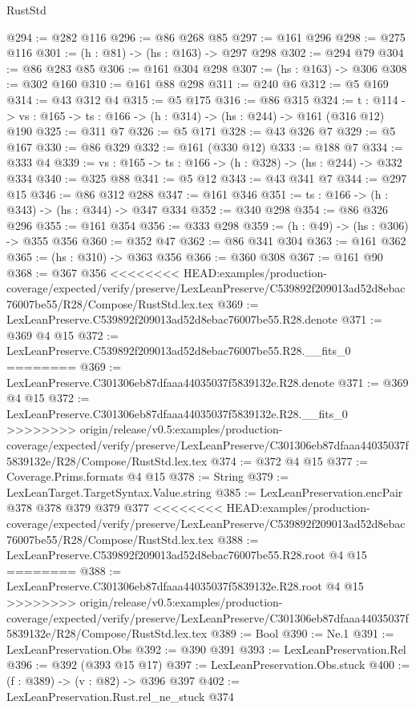 \begin{lexlean}{RustStd}
\begin{coremodule}
{\begin{coremodule}
@294 := @282 @116
@296 := @86 @268 @85
@297 := @161 @296
@298 := @275 @116
@301 := (h : @81) -> (hs : @163) -> @297 @298
@302 := @294 @79
@304 := @86 @283 @85
@306 := @161 @304 @298
@307 := (hs : @163) -> @306
@308 := @302 @160
@310 := @161 @88 @298
@311 := @240 @6
@312 := @5 @169
@314 := @43 @312 @4
@315 := @5 @175
@316 := @86 @315
@324 := {t : @114} ->
  {vs : @165} -> {ts : @166} -> (h : @314) -> (hs : @244) -> @161 (@316 @12) @190
@325 := @311 @7
@326 := @5 @171
@328 := @43 @326 @7
@329 := @5 @167
@330 := @86 @329
@332 := @161 (@330 @12)
@333 := @188 @7
@334 := @333 @4
@339 := {vs : @165} -> {ts : @166} -> (h : @328) -> (hs : @244) -> @332 @334
@340 := @325 @88
@341 := @5 @12
@343 := @43 @341 @7
@344 := @297 @15
@346 := @86 @312 @288
@347 := @161 @346
@351 := {ts : @166} -> (h : @343) -> (hs : @344) -> @347 @334
@352 := @340 @298
@354 := @86 @326 @296
@355 := @161 @354
@356 := @333 @298
@359 := (h : @49) -> (hs : @306) -> @355 @356
@360 := @352 @47
@362 := @86 @341 @304
@363 := @161 @362
@365 := (hs : @310) -> @363 @356
@366 := @360 @308
@367 := @161 @90
@368 := @367 @356
<<<<<<<< HEAD:examples/production-coverage/expected/verify/preserve/LexLeanPreserve/C539892f209013ad52d8ebac76007be55/R28/Compose/RustStd.lex.tex
@369 := LexLeanPreserve.C539892f209013ad52d8ebac76007be55.R28.denote
@371 := @369 @4 @15
@372 := LexLeanPreserve.C539892f209013ad52d8ebac76007be55.R28.__fits_0
========
@369 := LexLeanPreserve.C301306eb87dfaaa44035037f5839132e.R28.denote
@371 := @369 @4 @15
@372 := LexLeanPreserve.C301306eb87dfaaa44035037f5839132e.R28.__fits_0
>>>>>>>> origin/release/v0.5:examples/production-coverage/expected/verify/preserve/LexLeanPreserve/C301306eb87dfaaa44035037f5839132e/R28/Compose/RustStd.lex.tex
@374 := @372 @4 @15
@377 := Coverage.Prims.formats @4 @15
@378 := String
@379 := LexLeanTarget.TargetSyntax.Value.string
@385 := LexLeanPreservation.encPair @378 @378 @379 @379 @377
<<<<<<<< HEAD:examples/production-coverage/expected/verify/preserve/LexLeanPreserve/C539892f209013ad52d8ebac76007be55/R28/Compose/RustStd.lex.tex
@388 := LexLeanPreserve.C539892f209013ad52d8ebac76007be55.R28.root @4 @15
========
@388 := LexLeanPreserve.C301306eb87dfaaa44035037f5839132e.R28.root @4 @15
>>>>>>>> origin/release/v0.5:examples/production-coverage/expected/verify/preserve/LexLeanPreserve/C301306eb87dfaaa44035037f5839132e/R28/Compose/RustStd.lex.tex
@389 := Bool
@390 := Ne.{1}
@391 := LexLeanPreservation.Obs
@392 := @390 @391
@393 := LexLeanPreservation.Rel
@396 := @392 (@393 @15 @17)
@397 := LexLeanPreservation.Obs.stuck
@400 := (f : @389) -> (v : @82) -> @396 @397
@402 := LexLeanPreservation.Rust.rel_ne_stuck @374

\end{coremodule}}
\end{coremodule}
\end{lexlean}
